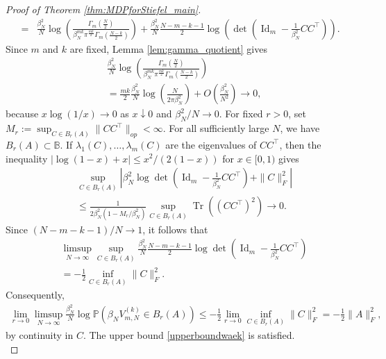 \documentclass[11pt,a4paper,twoside]{article}
\theoremstyle{definition}
\begin{document}
\begin{proof}[Proof of Theorem \ref{thm:MDPforStiefel_main}]
\begin{align*}
			=& \frac{\beta_N^2}{N} \log\left(\frac{\Gamma_m\left(\frac{N}{2}\right)}{\beta_N^{mk}\pi^{\frac{m k}{2}}\Gamma_m\left(\frac{N-k}{2}\right)} \right) +\frac{\beta_N^2}{N}\frac{N-m-k-1}{2}\log\left(\det\left(\operatorname{Id}_m - \frac{1}{\beta_N^2}CC^\top\right)\right).
		\end{align*}
		Since $m$ and $k$ are fixed, Lemma \ref{lem:gamma_quotient} gives
		\begin{align*}
		&\frac{\beta_N^2}{N}\log\left(\frac{\Gamma_m\left(\frac{N}{2}\right)}{\beta_N^{mk}\pi^{\frac{mk}{2}}\Gamma_m\left(\frac{N-k}{2}\right)}\right)\\
		&=\frac{mk}{2}\frac{\beta_N^2}{N}\log\left(\frac{N}{2\pi\beta_N^2}\right)+O\left(\frac{\beta_N^2}{N^2}\right)\longrightarrow0,
		\end{align*}
		because $x\log(1/x)\to0$ as $x\downarrow0$ and $\beta_N^2/N\to0$.
		For fixed $r>0$, set $M_r:=\sup_{C\in B_r(A)}\|CC^\top\|_{op}<\infty$. For all sufficiently large $N$, we have $B_r(A)\subset\mathbb{B}$. If $\lambda_1(C),\ldots,\lambda_m(C)$ are the eigenvalues of $CC^\top$, then the inequality $|\log(1-x)+x|\le x^2/(2(1-x))$ for $x\in[0,1)$ gives
		\begin{align*}
		&\sup_{C\in B_r(A)}\left|\beta_N^2\log\det\left(\operatorname{Id}_m-\frac{1}{\beta_N^2}CC^\top\right)+\|C\|_F^2\right|\\
		&\le \frac{1}{2\beta_N^2(1-M_r/\beta_N^2)}\sup_{C\in B_r(A)}\operatorname{Tr}\left((CC^\top)^2\right)\longrightarrow0.
		\end{align*}
		Since $(N-m-k-1)/N\to1$, it follows that
		\begin{align*}
		&\limsup_{N\to\infty}\sup_{C\in B_r(A)}\frac{\beta_N^2}{N}\frac{N-m-k-1}{2}\log\det\left(\operatorname{Id}_m-\frac{1}{\beta_N^2}CC^\top\right)\\
		&=-\frac{1}{2}\inf_{C\in B_r(A)}\|C\|_F^2.
		\end{align*}
		Consequently,
		\begin{align*}
		\lim _{r \rightarrow 0} \limsup _{N \rightarrow \infty} \frac{\beta_N^2}{N} \log \mathbb{P}\left(\beta_N V_{m,N}^{(k)} \in B_r(A)\right) \le - \frac{1}{2}\lim _{r \rightarrow 0}\inf_{C\in B_r(A)}\|C\|_F^2 = -\frac{1}{2}\|A\|_F^2,
		\end{align*}
		by continuity in $C$. The upper bound \eqref{upperboundwaek} is satisfied. \\


\end{proof}
\end{document}
